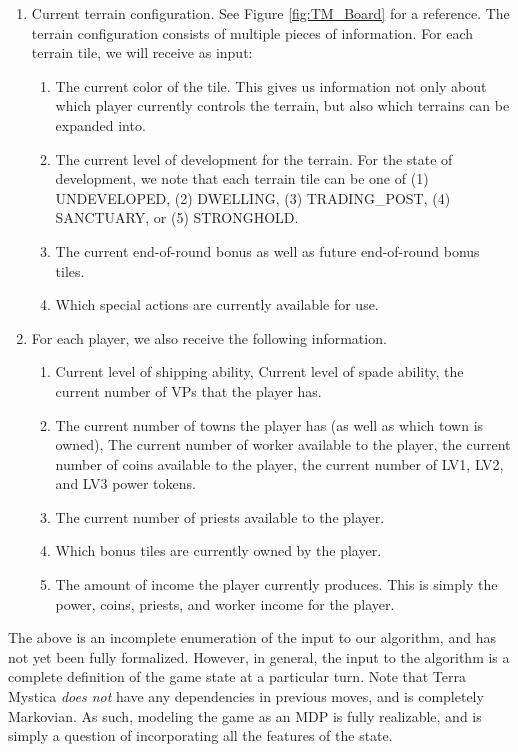 \documentclass[10pt,twocolumn,letterpaper]{article}
\begin{document}
\begin{enumerate}
    \item Current terrain configuration. See Figure \ref{fig:TM_Board} for a reference. The terrain configuration consists of multiple pieces of information. For each terrain tile, we will receive as input:
    \begin{enumerate}
        \item The current color of the tile. This gives us information not only about which player currently controls the terrain, but also which terrains can be expanded into.
        \item The current level of development for the terrain. For the state of development, we note that each terrain tile can be one of (1) UNDEVELOPED, (2) DWELLING, (3) TRADING\_POST, (4) SANCTUARY, or (5) STRONGHOLD.
        \item The current end-of-round bonus as well as future end-of-round bonus tiles.
        \item Which special actions are currently available for use.
    \end{enumerate}
    \item For each player, we also receive the following information.
    \begin{enumerate}
        \item Current level of shipping ability, Current level of spade ability, the current number of VPs that the player has.
        \item The current number of towns the player has (as well as which town is owned), The current number of worker available to the player, the current number of coins available to the player, the current number of LV1, LV2, and LV3 power tokens.
        \item The current number of priests available to the player.
        \item Which bonus tiles are currently owned by the player.
        \item The amount of income the player currently produces. This is simply the power, coins, priests, and worker income for the player.
    \end{enumerate}
\end{enumerate}

The above is an incomplete enumeration of the input to our algorithm, and has not yet been fully formalized. However, in general, the input to the algorithm is a complete definition of the game state at a particular turn. Note that Terra Mystica \textit{does not} have any dependencies in previous moves, and is completely Markovian. As such, modeling the game as an MDP is fully realizable, and is simply a question of incorporating all the features of the state.
\end{document}
